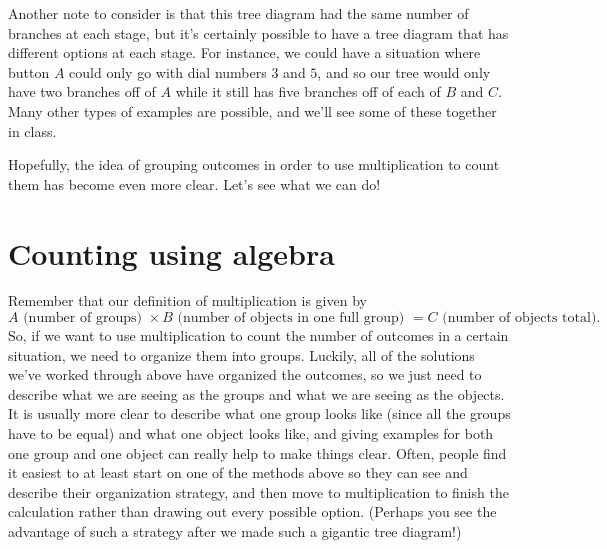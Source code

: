 \documentclass{ximera}
\begin{document}
Another note to consider is that this tree diagram had the same number of branches at each stage, but it's certainly possible to have a tree diagram that has different options at each stage. For instance, we could have a situation where button $A$ could only go with dial numbers $3$ and $5$, and so our tree would only have two branches off of $A$ while it still has five branches off of each of $B$ and $C$. Many other types of examples are possible, and we'll see some of these together in class.

Hopefully, the idea of grouping outcomes in order to use multiplication to count them has become even more clear. Let's see what we can do!



\section{Counting using algebra}
Remember that our definition of multiplication is given by
\[
A \textrm{ (number of groups) } \times B \textrm{ (number of objects in one full group) } = C \textrm{ (number of objects total)}.
\]
So, if we want to use multiplication to count the number of outcomes in a certain situation, we need to organize them into groups. Luckily, all of the solutions we've worked through above have organized the outcomes, so we just need to describe what we are seeing as the groups and what we are seeing as the objects. It is usually more clear to describe what one group looks like (since all the groups have to be equal) and what one object looks like, and giving examples for both one group and one object can really help to make things clear. Often, people find it easiest to at least start on one of the methods above so they can see and describe their organization strategy, and then move to multiplication to finish the calculation rather than drawing out every possible option. (Perhaps you see the advantage of such a strategy after we made such a gigantic tree diagram!)
\end{document}
